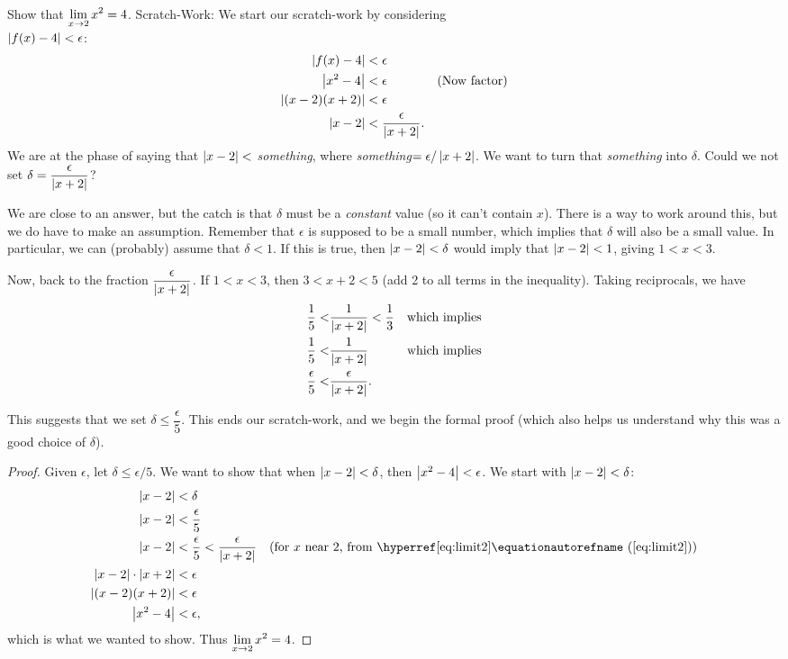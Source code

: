\begin{example}\label{ex_compute_lim2}%
Show that $\displaystyle\lim_{x\to2} x^2 = 4$.
\solution
Scratch-Work:
We start our scratch-work by considering\\
$\left\lvert f(x)-4 \right\rvert<\epsilon$:
\begin{align}
\left\lvert f(x)-4 \right\rvert &< \epsilon \notag\\
\left\lvert x^2-4 \right\rvert &< \epsilon & \text{(Now factor)}\notag\\
\left\lvert (x-2)(x+2) \right\rvert &< \epsilon \notag\\
\left\lvert x-2 \right\rvert &<\frac{\epsilon}{\left\lvert x+2 \right\rvert}.\label{eq:lim1}
\end{align}
We are at the phase of saying that $\left\lvert x-2 \right\rvert<$ \emph{something}, where \emph{something}$=\epsilon/\left\lvert x+2 \right\rvert$. We want to turn that \emph{something} into $\delta$. Could we not set $\delta = \dfrac{\epsilon}{\left\lvert x+2 \right\rvert}$?  

We are close to an answer, but the catch is that $\delta$ must be a \emph{constant} value (so it can't contain $x$).  There is a way to work around this, but we do have to make an assumption.  Remember that $\epsilon$ is supposed to be a small number, which implies that $\delta$ will also be a small value.  In particular, we can (probably) assume that $\delta < 1$.  If this is true, then $\left\lvert x-2 \right\rvert< \delta$ would imply that $\left\lvert x-2 \right\rvert< 1$, giving $1 < x < 3$.  

Now, back to the fraction $\dfrac{\epsilon}{\left\lvert x+2 \right\rvert}$.  If $1<x<3$, then $3<x+2<5$ (add 2 to all terms in the inequality).  Taking reciprocals, we have 
\begin{align}
\frac15 <& \frac1{\left\lvert x+2 \right\rvert} < \frac 13 & \text{which implies}\notag\\
\frac15 <& \frac1{\left\lvert x+2 \right\rvert} & \text{which implies}\notag\\
\frac\epsilon5<&\frac{\epsilon}{\left\lvert x+2 \right\rvert}\text{.}\label{eq:limit2}
\end{align}

This suggests that we set 
$\delta \leq \dfrac{\epsilon}{5}$. This ends our scratch-work, and we begin the formal proof (which also helps us understand why this was a good choice of $\delta$).

\begin{proof}
Given $\epsilon$, let $\delta \leq \epsilon/5$. We want to show that when $\left\lvert x-2 \right\rvert<\delta$, then $\left\lvert x^2-4 \right\rvert<\epsilon$. We start with $\left\lvert x-2 \right\rvert<\delta$:
\begin{align*}
\abs{x-2} &< \delta \\
\abs{x-2} &< \frac{\epsilon}5\\
\abs{x-2} &< \frac\epsilon5 < \frac{\epsilon}{\abs{x+2}} & \text{(for $x$ near 2, from \autoeqref{eq:limit2})}\\
\abs{x-2}\cdot\abs{x+2} &< \epsilon\\
\abs{(x-2)(x+2)} &< \epsilon\\
\abs{x^2-4} &<\epsilon,
\end{align*}
which is what we wanted to show. Thus $\displaystyle \lim_{x\to 2}x^2 = 4$.
\end{proof}


\end{example}
